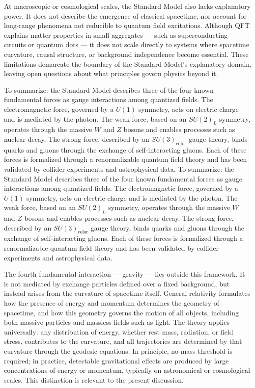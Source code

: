 At macroscopic or cosmological scales, the Standard Model also lacks explanatory power. It does not describe the emergence of classical spacetime, nor account for long-range phenomena not reducible to quantum field excitations. Although QFT explains matter properties in small aggregates — such as superconducting circuits or quantum dots — it does not scale directly to systems where spacetime curvature, causal structure, or background independence become essential. These limitations demarcate the boundary of the Standard Model's explanatory domain, leaving open questions about what principles govern physics beyond it.

To summarize: the Standard Model describes three of the four known fundamental forces as gauge interactions among quantized fields. The electromagnetic force, governed by a $U(1)$ symmetry, acts on electric charge and is mediated by the photon. The weak force, based on an $SU(2)_L$ symmetry, operates through the massive $W$ and $Z$ bosons and enables processes such as nuclear decay. The strong force, described by an $SU(3)_\text{color}$ gauge theory, binds quarks and gluons through the exchange of self-interacting gluons. Each of these forces is formalized through a renormalizable quantum field theory and has been validated by collider experiments and astrophysical data.
To summarize: the Standard Model describes three of the four known fundamental forces as gauge interactions among quantized fields. The electromagnetic force, governed by a $U(1)$ symmetry, acts on electric charge and is mediated by the photon. The weak force, based on an $SU(2)_L$ symmetry, operates through the massive $W$ and $Z$ bosons and enables processes such as nuclear decay. The strong force, described by an $SU(3)_\text{color}$ gauge theory, binds quarks and gluons through the exchange of self-interacting gluons. Each of these forces is formalized through a renormalizable quantum field theory and has been validated by collider experiments and astrophysical data.

The fourth fundamental interaction — gravity — lies outside this framework. It is not mediated by exchange particles defined over a fixed background, but instead arises from the curvature of spacetime itself. General relativity formulates how the presence of energy and momentum determines the geometry of spacetime, and how this geometry governs the motion of all objects, including both massive particles and massless fields such as light. The theory applies universally: any distribution of energy, whether rest mass, radiation, or field stress, contributes to the curvature, and all trajectories are determined by that curvature through the geodesic equations. In principle, no mass threshold is required; in practice, detectable gravitational effects are produced by large concentrations of energy or momentum, typically on astronomical or cosmological scales. This distinction is relevant to the present discussion.


